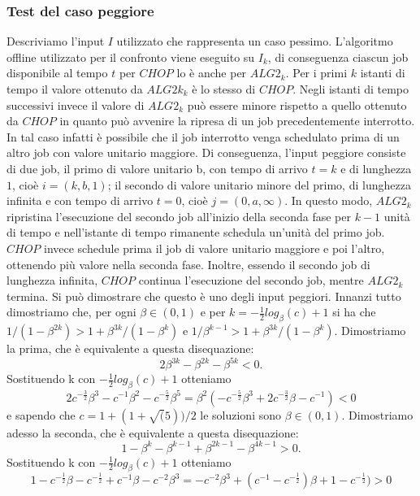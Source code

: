 \documentclass[12pt]{article}
\begin{document}
\subsubsection{Test del caso peggiore}
Descriviamo l'input $I$ utilizzato che rappresenta un caso pessimo. L'algoritmo offline utilizzato per il confronto viene eseguito su $I_{k}$, di conseguenza ciascun job disponibile al tempo $t$ per $CHOP$ lo è anche per $ALG2_{k}$. Per i primi $k$ istanti di tempo il valore ottenuto da $ALG2k_{k}$ è lo stesso di $CHOP$. Negli istanti di tempo successivi invece il valore di $ALG2_{k}$ può essere minore rispetto a quello ottenuto da $CHOP$ in quanto può avvenire la ripresa di un job precedentemente interrotto. In tal caso infatti è possibile che il job interrotto venga schedulato prima di un altro job con valore unitario maggiore. Di conseguenza, l'input peggiore consiste di due job, il primo di valore unitario b, con tempo di arrivo $t = k$ e di lunghezza $1$, cioè $i = (k, b, 1)$; il secondo di valore unitario minore del primo, di lunghezza infinita e con tempo di arrivo $t = 0$, cioè $j = (0, a, \infty)$. In questo modo, $ALG2_{k}$ ripristina l'esecuzione del secondo job all'inizio della seconda fase per $k - 1$ unità di tempo e nell'istante di tempo rimanente schedula un'unità del primo job. $CHOP$ invece schedule prima il job di valore unitario maggiore e poi l'altro, ottenendo più valore nella seconda fase. Inoltre, essendo il secondo job di lunghezza infinita, $CHOP$ continua l'esecuzione del secondo job, mentre $ALG2_{k}$ termina. Si può dimostrare che questo è uno degli input peggiori. Innanzi tutto dimostriamo che, per ogni $\beta \in (0,1)$ e per $k = -\frac{1}{2}log_{\beta}(c) + 1$ si ha che $1/(1 - \beta^{2k}) > 1 + \beta^{3k}/(1 - \beta^{k})$ e $1/\beta^{k-1} > 1 + \beta^{3k}/(1 - \beta^{k})$. Dimostriamo la prima, che è equivalente a questa disequazione: 
$$2\beta^{3k} - \beta^{2k} - \beta^{5k} < 0.$$
Sostituendo k con $-\frac{1}{2}log_{\beta}(c) + 1$ otteniamo 
$$2c^{-\frac{3}{2}}\beta^{3} - c^{-1}\beta^{2} - c^{-\frac{5}{2}}\beta^{5} = \beta^{2}(-c^{-\frac{5}{2}}\beta^{3} +2c^{-\frac{3}{2}}\beta - c^{-1}) < 0$$
e sapendo che $c=1 + (1 + \sqrt(5))/2$ le soluzioni sono $\beta \in (0,1)$. Dimostriamo adesso la seconda, che è equivalente a questa disequazione:
$$1 - \beta^{k} - \beta^{k-1} + \beta^{2k -1} - \beta^{4k - 1} > 0.$$
Sostituendo k con $-\frac{1}{2}log_{\beta}(c) + 1$ otteniamo 
$$1 - c^{-\frac{1}{2}}\beta - c^{-\frac{1}{2}} + c^{-1}\beta - c^{-2}\beta^{3} = -c^{-2}\beta^{3} + (c^{-1} - c^{-\frac{1}{2}})\beta + 1 - c^{-\frac{1}{2}}) > 0$$
\end{document}
